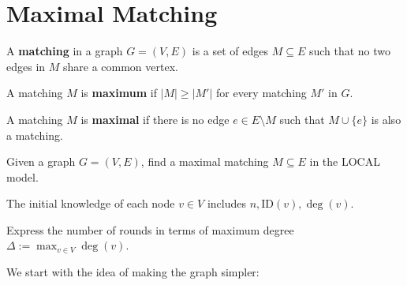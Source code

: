 \chapter{Maximal Matching}

\begin{definition}
	A \textbf{matching} in a graph \( G = (V, E) \) is a set of edges \( M \subseteq E \) such that no two edges in \( M \) share a common vertex.

	A matching $M$ is \textbf{maximum} if $|M| \geq |M'|$ for every matching $M'$ in $G$.

	A matching $M$ is \textbf{maximal} if there is no edge $e \in E \setminus M$ such that $M \cup \{e\}$ is also a matching.
\end{definition}

\begin{problem}
Given a graph \( G = (V, E) \), find a maximal matching \( M \subseteq E \) in the LOCAL model.

The initial knowledge of each node \( v \in V \) includes $n, \text{ID}(v), \deg(v)$.

Express the number of rounds in terms of maximum degree $\Delta := \max_{v \in V} \deg(v)$.
\end{problem}

We start with the idea of making the graph simpler:

